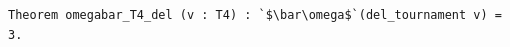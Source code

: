 \begin{lstlisting}[language=Rocq]
Theorem omegabar_T4_del (v : T4) : `$\bar\omega$`(del_tournament v) = 3.
\end{lstlisting}
